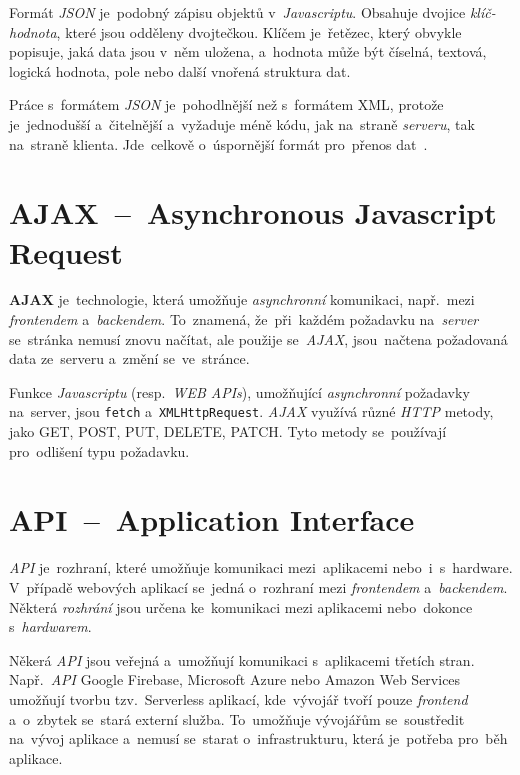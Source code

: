 \documentclass[11pt,a4paper]{report}
\begin{document}
            Formát \emph{JSON} je~podobný zápisu objektů v~\emph{Javascriptu}. Obsahuje dvojice \emph{klíč-hodnota}, které jsou odděleny dvojtečkou. Klíčem je~řetězec, který obvykle popisuje, jaká data jsou v~něm uložena, a~hodnota může být číselná, textová, logická hodnota, pole nebo další vnořená struktura dat.
            
            Práce s~formátem \emph{JSON} je~pohodlnější než s~formátem XML, protože je~jednodušší a~čitelnější a~vyžaduje méně kódu, jak na~straně \emph{serveru}, tak na~straně klienta. Jde~celkově o~úspornější formát pro~přenos dat~\cite{Dorman:webmappingajax}.

        \section{AJAX~--~Asynchronous Javascript Request}
            \textbf{AJAX} je~technologie, která umožňuje \emph{asynchronní} komunikaci, např.~mezi \emph{frontendem} a~\emph{backendem}. To~znamená, že~při~každém požadavku na~\emph{server} se~stránka nemusí znovu načítat, ale použije se~\emph{AJAX}, jsou~načtena požadovaná data ze~serveru a~změní se~ve~stránce.

            Funkce \emph{Javascriptu} (resp.~\emph{WEB APIs}), umožňující \emph{asynchronní} požadavky na~server, jsou \texttt{fetch} a~\texttt{XMLHttpRequest}. \emph{AJAX} využívá různé \emph{HTTP} metody, jako GET, POST, PUT, DELETE, PATCH. Tyto metody se~používají pro~odlišení typu požadavku.\cite{ajax:mdn, Dorman:webmappingajax}

        \section{API~--~Application Interface}
            \emph{API} je~rozhraní, které umožňuje komunikaci mezi~aplikacemi nebo~i~s~hardware. V~případě webových aplikací se~jedná o~rozhraní mezi \emph{frontendem} a~\emph{backendem}. Některá \emph{rozhrání} jsou určena ke~komunikaci mezi aplikacemi nebo~dokonce s~\emph{hardwarem}.
            
            Někerá \emph{API} jsou veřejná a~umožňují komunikaci s~aplikacemi třetích stran. Např.~\emph{API} Google Firebase, Microsoft Azure nebo Amazon Web Services umožňují tvorbu tzv.~Serverless aplikací, kde~vývojář tvoří pouze \emph{frontend} a~o~zbytek se~stará externí služba. To~umožňuje vývojářům se~soustředit na~vývoj aplikace a~nemusí se~starat o~infrastrukturu, která je~potřeba pro~běh aplikace.
\end{document}
